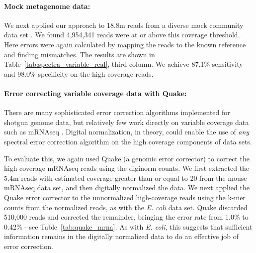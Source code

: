 \documentclass{article}
\begin{document}
\paragraph{Mock metagenome data:}


We next applied our approach to 18.8m reads from a diverse mock community
data set \cite{podar}. We found 4,954,341 reads were at or above
this coverage threshold.  Here errors were again calculated by mapping
the reads to the known reference and finding mismatches.  The results
are shown in Table~\ref{tab:spectra_variable_real}, third column.  We
achieve 87.1\% sensitivity and 98.0\% specificity on the high coverage
reads.

\paragraph{Error correcting variable coverage data with Quake:}


There are many sophisticated error correction algorithms implemented
for shotgun genome data, but relatively few work directly on variable
coverage data such as mRNAseq \cite{Medvedev2011, seecer}.  Digital
normalization, in theory, could enable the use of {\em any} spectral
error correction algorithm on the high coverage components of data
sets.

To evaluate this, we again used Quake (a genomic error corrector) to correct
the high coverage mRNAseq reads using the diginorm counts.  We first
extracted the 5.4m reads with estimated coverage greater than or equal
to 20 from the mouse mRNAseq data set, and then digitally normalized
the data.  We next applied the Quake error corrector to the
unnormalized high-coverage reads using the k-mer counts from the
normalized reads, as with the {\em E. coli} data set.  Quake discarded
510,000 reads and corrected the remainder, bringing the error rate
from 1.0\% to 0.42\% - see Table~\ref{tab:quake_mrna}.  As with {\em
  E. coli}, this suggests that sufficient information remains in the
digitally normalized data to do an effective job of error correction.

\end{document}

